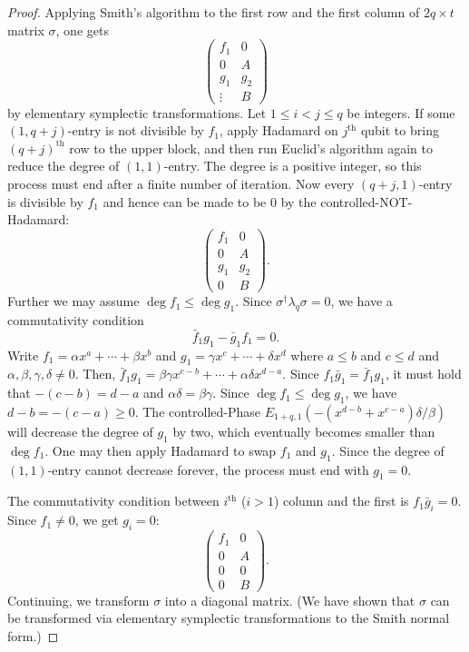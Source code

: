 \begin{proof}
Applying Smith's algorithm to the first row and the first column of $2q \times t$ matrix $\sigma$,
one gets
\[
\begin{pmatrix}
  f_1 & 0 \\
  0   & A \\
  \hline
  g_1 & g_2 \\
  \vdots   & B  
\end{pmatrix}
\]
by elementary symplectic transformations.
Let $1 \le i < j \le q$ be integers.
If some $(1,q+j)$-entry is not divisible by $f_1$,
apply Hadamard on $j^\text{th}$ qubit to bring $(q+j)^\text{th}$ row to the upper block,
and then run Euclid's algorithm again to reduce the degree of $(1,1)$-entry.
The degree is a positive integer, so this process must end after a finite number of iteration.
Now every $(q+j,1)$-entry is divisible by $f_1$ and hence can be made to be $0$
by the controlled-NOT-Hadamard:
\[
\begin{pmatrix}
  f_1 & 0 \\
  0   & A \\
  \hline
  g_1 & g_2 \\
  0   & B  
\end{pmatrix} .
\]
Further we may assume $\deg f_1 \le \deg g_1$.
Since $\sigma^\dagger \lambda_q \sigma = 0$,
we have a commutativity condition
\[
 \bar f_1 g_1 - \bar g_1 f_1 = 0 .
\]
Write $f_1 = \alpha x^a + \cdots + \beta x^b $
and $ g_1 = \gamma x^c + \cdots + \delta x^d $
where $ a \le b$ and $c \le d$ and $\alpha,\beta,\gamma,\delta \neq 0$.
Then, $\bar f_1 g_1 = \beta \gamma x^{c-b} + \cdots + \alpha \delta x^{d-a}$.
Since $f_1 \bar g_1 = \bar f_1 g_1$, it must hold that $-(c-b)=d-a$
and $\alpha \delta = \beta \gamma$.
Since $\deg f_1 \le \deg g_1$, we have $d-b = -(c-a) \ge 0$.
The controlled-Phase $E_{1+q,1}( -(x^{d-b} + x^{c-a})\delta / \beta )$
will decrease the degree of $g_1$ by two,
which eventually becomes smaller than $\deg f_1$.
One may then apply Hadamard to swap $f_1$ and $g_1$.
Since the degree of $(1,1)$-entry cannot decrease forever,
the process must end with $g_1 = 0$.

The commutativity condition between $i^\text{th}$ ($i>1$) column and the first
is $ f_1 \bar g_i = 0 $. Since $f_1 \ne 0$, we get $g_i = 0$:
\[
\begin{pmatrix}
  f_1 & 0 \\
  0   & A \\
  \hline
  0 & 0 \\
  0 & B  
\end{pmatrix} .
\]
Continuing, we transform $\sigma$ into a diagonal matrix.
(We have shown that $\sigma$ can be transformed 
via elementary symplectic transformations to the Smith normal form.)


\end{proof}
